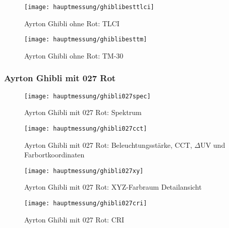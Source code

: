 \documentclass[pagesize,paper=A4,fontsize=12pt,utf8,numbers=noenddot,bibliography=totoc,listof=totoc,DIV=11,BCOR=1mm]{scrreprt}
\begin{document}
\begin{figure}[htp]     %
\centering
\texttt{[image: hauptmessung/ghiblibesttlci]} 
\caption {Ayrton Ghibli ohne Rot: TLCI} 
\end{figure}

\begin{figure}[htp]     %
\centering
\texttt{[image: hauptmessung/ghiblibesttm]} 
\caption {Ayrton Ghibli ohne Rot: TM-30} 
\end{figure}

\subsubsection{Ayrton Ghibli mit 027 Rot}

\begin{figure}[htp]     %
\centering
\texttt{[image: hauptmessung/ghibli027spec]} 
\caption {Ayrton Ghibli mit 027 Rot: Spektrum} 
\end{figure}

\begin{figure}[htp]     %
\centering
\texttt{[image: hauptmessung/ghibli027cct]} 
\caption {Ayrton Ghibli mit 027 Rot: Beleuchtungsstärke, CCT, $\Delta$UV und Farbortkoordinaten} 
\end{figure}

\begin{figure}[htp]     %
\centering
\texttt{[image: hauptmessung/ghibli027xy]} 
\caption {Ayrton Ghibli mit 027 Rot: XYZ-Farbraum Detailansicht} 
\end{figure}

\begin{figure}[htp]     %
\centering
\texttt{[image: hauptmessung/ghibli027cri]} 
\caption {Ayrton Ghibli mit 027 Rot: CRI} 
\end{figure}
\end{document}

